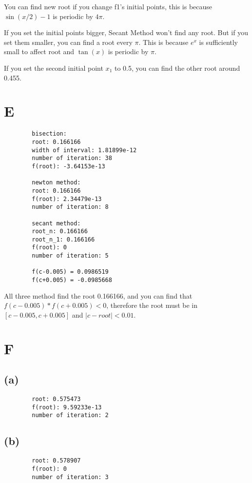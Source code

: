 \documentclass{article}
\begin{document}
    You can find new root if you change f1's initial points, this is because $\sin(x/2)-1$ is periodic by $4\pi$.

    If you set the initial points bigger, Secant Method won't find any root. But if you set them smaller, you can find a root every $\pi$.
    This is because $e^x$ is sufficiently small to affect root and $\tan(x)$ is periodic by $\pi$.

    If you set the second initial point $x_1$ to 0.5, you can find the other root around 0.455.

\section{E}
    \begin{verbatim}
        bisection:
        root: 0.166166
        width of interval: 1.81899e-12
        number of iteration: 38
        f(root): -3.64153e-13

        newton method:
        root: 0.166166
        f(root): 2.34479e-13
        number of iteration: 8

        secant method:
        root_n: 0.166166
        root_n_1: 0.166166
        f(root): 0
        number of iteration: 5

        f(c-0.005) = 0.0986519
        f(c+0.005) = -0.0985668
    \end{verbatim}

    All three method find the root 0.166166, and you can find that $f(c-0.005)*f(c+0.005)<0$,
    therefore the root must be in $[c-0.005,c+0.005]$ and $|c-root|<0.01$.

\section{F}
\subsection{(a)}
    \begin{verbatim}
        root: 0.575473
        f(root): 9.59233e-13
        number of iteration: 2
    \end{verbatim}
\subsection{(b)}
    \begin{verbatim}
        root: 0.578907
        f(root): 0
        number of iteration: 3
    \end{verbatim}
\end{document}
